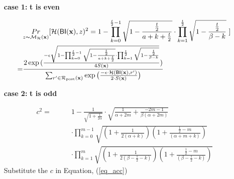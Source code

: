 \documentclass{article}
\begin{document}
 \begin{itemize}

  \item[\textbf{case 1:}] \textbf{t is even}

  \begin{align*}
  &\underset{z \thicksim \mathcal{M}_{\mathcal{H}}(\textbf{x})}{Pr}[\mathcal{H}(\mathsf{BI}(\textbf{x}), z)^2 = 
  1 - \prod_{k = 0}^{\frac{t}{2} - 1}
  \sqrt{1 - \frac{\frac{t}{2}}{a + k + \frac{t}{2}}}
  \cdot
  \prod_{k = 1}^{\frac{t}{2}}
  \sqrt{1 - \frac{\frac{t}{2}}{\beta - k}}\ ]\\
  = & \frac{2 \exp{(\frac{- \epsilon \sqrt{1 - \prod_{k = 0}^{\frac{t}{2} - 1}
  \sqrt{1 - \frac{\frac{t}{2}}{a + k + \frac{t}{2}}}
  \cdot
  \prod_{k = 1}^{\frac{t}{2}}
  \sqrt{1 - \frac{\frac{t}{2}}{\beta - k}}}}{4 S(\textbf{x})})}}
  {\sum_{r'\in \mathcal{R}_{\textup{post}}(\textbf{x})} \exp \big(\frac{-\epsilon\cdot \mathcal{H} (\mathsf{BI}(\textbf{x}),r')}{2 \cdot S(\textbf{x})}\big)}
  \end{align*}


  \item[\textbf{case 2:}] \textbf{t is odd}

  \begin{align*}
  c^2 = \qquad &
  1 - \frac{1}{\sqrt{1 + \frac{1}{2\alpha}}} \cdot 
  \sqrt{\frac{1}{\alpha + 2m} + \frac{- 2m - 1}{\beta(\alpha + 2m)}} \\
  \qquad &\cdot 
  \prod_{k = 0}^{m-1}
  \sqrt{(1 + \frac{1}{2(\alpha + k)})
  (1 + \frac{\frac{1}{2} - m}{(\alpha + m  + k)})
  } \\
  \qquad & \cdot 
  \prod_{k = 1}^{m} 
  \sqrt{(1 + \frac{1}{2(\beta - \frac{1}{2}- k)})(1 + \frac{\frac{1}{2} - m}{(\beta - \frac{1}{2}- k)})}
  \end{align*}
  Substitute the $c$ in Equation, (\ref{eq_acc})

\end{itemize}






\end{document}
